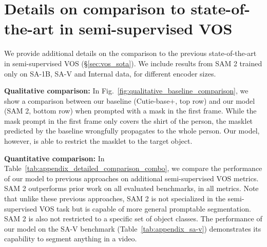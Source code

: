 \documentclass[]{fairmeta}
\newcommand{\figref}[1]{Fig.~\ref{#1}}
\newcommand{\secref}[1]{\S\ref{#1}}
\newcommand{\tabref}[1]{Table~\ref{#1}}
\begin{document}
\section{Details on comparison to state-of-the-art in semi-supervised VOS}
\label{sec:supp_vos_sota}

We provide additional details on the comparison to the previous state-of-the-art in semi-supervised VOS (\secref{sec:vos_sota}). We include results from SAM 2 trained only on SA-1B, SA-V and Internal data, for different encoder sizes.

\textbf{Qualitative comparison:} In \figref{fig:qualitative_baseline_comparison}, we show a comparison between our baseline (Cutie-base+, top row) and our model (SAM 2, bottom row) when prompted with a mask in the first frame. 
While the mask prompt in the first frame only covers the shirt of the person, the masklet predicted by the baseline wrongfully propagates to the whole person. Our model, however, is able to restrict the masklet to the target object.

\textbf{Quantitative comparison:} In Table~\ref{tab:appendix_detailed_comparison_combo}, we compare the performance of our model to previous approaches on additional semi-supervised VOS metrics. SAM 2 outperforms prior work on all evaluated benchmarks, in all metrics. Note that unlike these previous approaches, SAM 2 is not specialized in the semi-supervised VOS task but is capable of more general promptable segmentation.
SAM 2 is also not restricted to a specific set of object classes. The performance of our model on the SA-V benchmark (\tabref{tab:appendix_sa-v}) demonstrates its capability to segment anything in a video.
\end{document}
